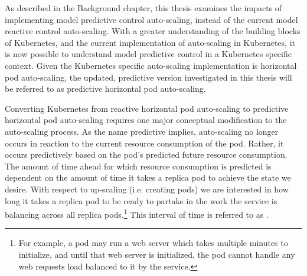 As described in the Background chapter, this thesis examines the impacts of
implementing model predictive control auto-scaling, instead of the current model reactive
control auto-scaling. With a greater understanding of the building blocks of
Kubernetes, and the current implementation of auto-scaling in Kubernetes, it is
now possible to understand model predictive control in a Kubernetes specific
context. Given the Kubernetes specific auto-scaling implementation is horizontal
pod auto-scaling, the updated, predictive version investigated in this thesis
will be referred to as predictive horizontal pod auto-scaling.

Converting Kubernetes from reactive horizontal pod auto-scaling to predictive
horizontal pod auto-scaling requires one major conceptual modification to the
auto-scaling process. As the name predictive implies, auto-scaling no longer
occurs in reaction to the current resource consumption of the pod. Rather, it occurs
predictively based on the pod's predicted future resource consumption. The
amount of time ahead for which resource consumption is predicted is dependent on
the amount of time it takes a replica pod to achieve the state we desire. With
respect to up-scaling (i.e. creating pods) we are interested in how long it
takes a replica pod to be ready to partake in the work the
service is balancing across all replica pods.\footnote{For example, a pod may
run a web server which takes multiple minutes to initialize, and until that web server
is initialized, the pod cannot handle any web requests load balanced to it by
the service.} This interval of time is referred to as .

